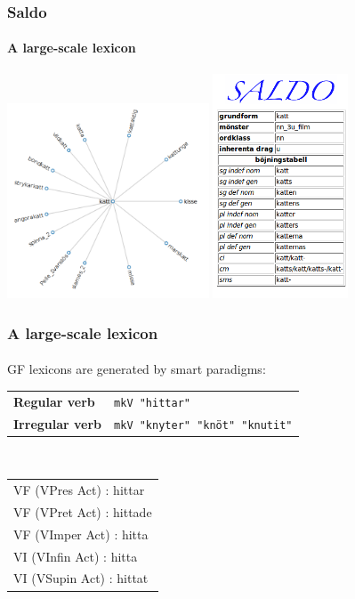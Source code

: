 \documentclass[10pt]{beamer}
\begin{document}
\begin{frame}
\frametitle{Saldo}
\framesubtitle{A large-scale lexicon}
\includegraphics[width=60mm]{saldograph.png}
\includegraphics[width=40mm]{saldotab.png}
\end{frame}


\begin{frame}[containsverbatim]
\frametitle{A large-scale lexicon}
\framesubtitle{} 
GF lexicons are generated by smart paradigms: \\
\vspace{5mm}
\begin{tabular}{ll}
\textbf{Regular verb} & \verb-mkV "hittar"- \\
\textbf{Irregular verb} &  \verb-mkV "knyter" "knöt" "knutit"- \\
\end{tabular}\\

\vspace{5mm}
\hspace{5mm}
\begin{small}
\begin{tabular}{|l|}
\hline
VF (VPres Act) : hittar \\
VF (VPret Act) : hittade \\
VF (VImper Act) : hitta \\
VI (VInfin Act) : hitta \\
VI (VSupin Act) : hittat \\
\hline
\end{tabular}
\end{small}
\end{frame}
\end{document}

